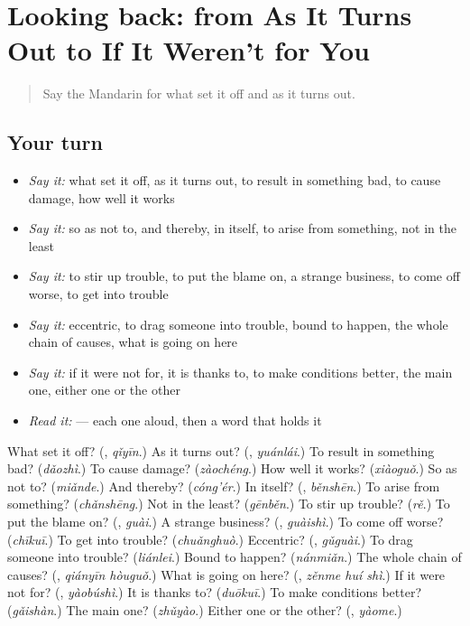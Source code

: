 \section[(dialogue)]{Looking back: from As It Turns Out to If It Weren't for You}

\label{lesson:ZH-R541-review-537-541}



\begin{quote}
Say the Mandarin for what set it off and as it turns out.
\end{quote}

\subsection*{Your turn}
\begin{itemize}
\raggedright
  \item \emph{Say it:} what set it off, as it turns out, to result in something bad, to cause damage, how well it works
  \item \emph{Say it:} so as not to, and thereby, in itself, to arise from something, not in the least
  \item \emph{Say it:} to stir up trouble, to put the blame on, a strange business, to come off worse, to get into trouble
  \item \emph{Say it:} eccentric, to drag someone into trouble, bound to happen, the whole chain of causes, what is going on here
  \item \emph{Say it:} if it were not for, it is thanks to, to make conditions better, the main one, either one or the other
  \item \emph{Read it:}   — each one aloud, then a word that holds it
\end{itemize}

\begin{tcolorbox}[breakable,colback=teal!4,colframe=teal!35!black,title={Before you move on}]
What set it off? (\textbf{}, \emph{qǐyīn}.) As it turns out? (\textbf{}, \emph{yuánlái}.) To result in something bad? (\emph{dǎozhì}.) To cause damage? (\emph{zàochéng}.) How well it works? (\emph{xiàoguǒ}.) So as not to? (\emph{miǎnde}.) And thereby? (\emph{cóng'ér}.) In itself? (\textbf{}, \emph{běnshēn}.) To arise from something? (\emph{chǎnshēng}.) Not in the least? (\emph{gēnběn}.) To stir up trouble? (\emph{rě}.) To put the blame on? (\textbf{}, \emph{guài}.) A strange business? (\textbf{}, \emph{guàishì}.) To come off worse? (\emph{chīkuī}.) To get into trouble? (\emph{chuǎnghuò}.) Eccentric? (\textbf{}, \emph{gǔguài}.) To drag someone into trouble? (\emph{liánlei}.) Bound to happen? (\emph{nánmiǎn}.) The whole chain of causes? (\textbf{}, \emph{qiányīn hòuguǒ}.) What is going on here? (\textbf{}, \emph{zěnme huí shì}.) If it were not for? (\textbf{}, \emph{yàobúshì}.) It is thanks to? (\emph{duōkuī}.) To make conditions better? (\emph{gǎishàn}.) The main one? (\emph{zhǔyào}.) Either one or the other? (\textbf{}, \emph{yàome}.)
\end{tcolorbox}
